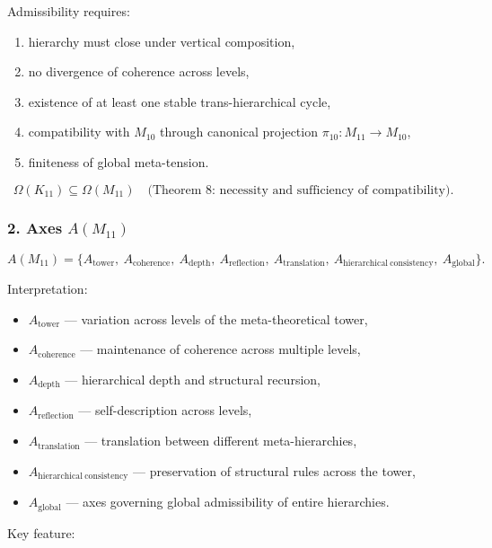 Admissibility requires:

\begin{enumerate}
    \item hierarchy must close under vertical composition,
    \item no divergence of coherence across levels,
    \item existence of at least one stable trans-hierarchical cycle,
    \item compatibility with $M_{10}$ through canonical projection
          $\pi_{10}:M_{11}\to M_{10}$,
    \item finiteness of global meta-tension.
\end{enumerate}

\[
\Omega(K_{11}) \subseteq \Omega(M_{11})
\quad\text{(Theorem 8: necessity and sufficiency of compatibility)}.
\]

\subsubsection*{2. Axes $A(M_{11})$}

\[
A(M_{11}) =
\{
A_{\mathrm{tower}},\
A_{\mathrm{coherence}},\
A_{\mathrm{depth}},\
A_{\mathrm{reflection}},\
A_{\mathrm{translation}},\
A_{\mathrm{hierarchical\ consistency}},\
A_{\mathrm{global}}
\}.
\]

Interpretation:

\begin{itemize}
    \item $A_{\mathrm{tower}}$ — variation across levels of the meta-theoretical tower,
    \item $A_{\mathrm{coherence}}$ — maintenance of coherence across multiple levels,
    \item $A_{\mathrm{depth}}$ — hierarchical depth and structural recursion,
    \item $A_{\mathrm{reflection}}$ — self-description across levels,
    \item $A_{\mathrm{translation}}$ — translation between different meta-hierarchies,
    \item $A_{\mathrm{hierarchical\ consistency}}$ — preservation of structural rules across the tower,
    \item $A_{\mathrm{global}}$ — axes governing global admissibility of entire hierarchies.
\end{itemize}

Key feature:

